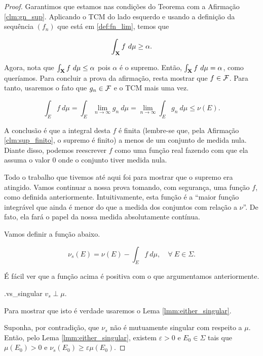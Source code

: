 \begin{proof}
    Garantimos que estamos nas condições do Teorema com a Afirmação \ref{clm:gn_sup}. Aplicando o TCM do lado esquerdo e usando a definição da sequência $(f_n)$ que está em \eqref{def:fn_lim}, temos que
    
    \begin{equation*}
         \int_{\mathbf{X}} f \ d\mu \geq \alpha.
    \end{equation*}

    Agora, nota que $\int_{\mathbf{X}} f \ d\mu \leq \alpha$ pois $\alpha$ é o supremo. Então, $\int_{\mathbf{X}} f \ d\mu = \alpha$, como queríamos. Para concluir a prova da afirmação, resta mostrar que $f\in\mathcal{F}$. Para tanto, usaremos o fato que $g_n\in\mathcal{F}$ e o TCM mais uma vez.

    \begin{equation*}
        \int_E f\ d\mu = \int_E \lim_{n\to\infty} g_n \ d\mu = \lim_{n\to\infty} \int_{E} g_n \ d\mu \leq \nu(E).
    \end{equation*}

    A conclusão é que a integral desta $f$ é finita (lembre-se que, pela Afirmação \eqref{clm:sup_finito}, o supremo é finito) a menos de um conjunto de medida nula. Diante disso, podemos reescrever $f$ como uma função real fazendo com que ela assuma o valor $0$ onde o conjunto tiver medida nula.

    Todo o trabalho que tivemos até aqui foi para mostrar que o supremo era atingido. Vamos continuar a nossa prova tomando, com segurança, uma função $f$, como definida anteriormente. Intuitivamente, esta função é a ``maior função integrável que ainda é menor do que a medida dos conjuntos com relação a $\nu$''. De fato, ela fará o papel da nossa medida absolutamente contínua.

    Vamos definir a função abaixo.

    \begin{equation}\label{def:v_singular}
        \nu_s(E) = \nu(E) - \int_E f \ d\mu, \quad \forall \ E\in \Sigma.
    \end{equation}

    É fácil ver que a função acima é positiva com o que argumentamos anteriormente.

    \begin{claim}{.}{vs_singular}
        $v_s \perp \mu$.
    \end{claim}

    Para mostrar que isto é verdade usaremos o Lema \ref{lmm:either_singular}.
    
    Suponha, por contradição, que $\nu_s$ não é mutuamente singular com respeito a $\mu$. Então, pelo Lema \ref{lmm:either_singular}, existem $\varepsilon > 0$ e $E_0\in\Sigma$ tais que $\mu(E_0)>0$ e $\nu_s(E_0) \geq \varepsilon \mu(E_0)$.


\end{proof}
